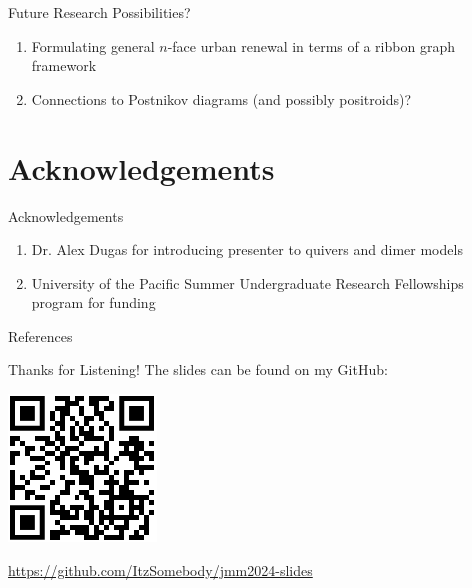 \begin{frame}{Future Research Possibilities?}
\begin{enumerate}
\begin{center}
        \end{center}

        \vfill
        
        \item Formulating general $n$-face urban renewal in terms of a ribbon graph framework \cite{bocklandtDimerABC2015}
        
        \vfill
        
        \item Connections to Postnikov diagrams (and possibly positroids)?
    \end{enumerate}
\end{frame}


\section{Acknowledgements}

\begin{frame}{Acknowledgements}
    \begin{enumerate}
        \item Dr. Alex Dugas for introducing presenter to quivers and dimer models
        
        \vfill

        \item University of the Pacific Summer Undergraduate Research Fellowships program for funding
    \end{enumerate}
\end{frame}

\begin{frame}[allowframebreaks]{References}
    \printbibliography
\end{frame}


\begin{frame}{Thanks for Listening!}
    The slides can be found on my GitHub:
    \begin{center}
        \includegraphics[scale=1]{figures/github_qr.png}
        
        \url{https://github.com/ItzSomebody/jmm2024-slides}
    \end{center}
\end{frame}